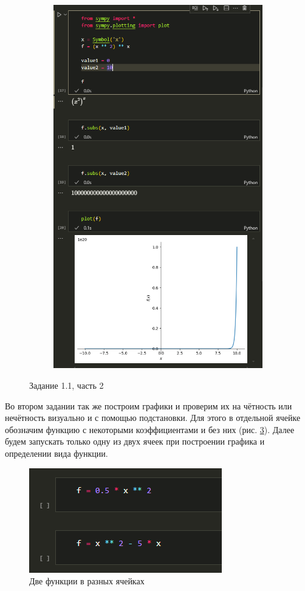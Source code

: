 \documentclass[14pt,a4paper]{extarticle}
\begin{document}
\begin{figure}[!ht]
\begin{subfigure}{.5\textwidth}
        \includegraphics[width=0.9\linewidth]{figures/1.1 (4).png}
        \label{fig:1.1(4)}
    \end{subfigure}
    \caption{Задание 1.1, часть 2}
    \label{fig:1.1-part2}
\end{figure}

Во втором задании так же построим графики и проверим их на чётность
или нечётность визуально и с помощью подстановки. Для этого в отдельной
ячейке обозначим функцию с некоторыми коэффициентами и без них (рис. \ref{fig:1.2-2funcs}).
Далее будем запускать только одну из двух ячеек при построении графика и
определении вида функции.

\begin{figure}[!ht]
    \centering
    \includegraphics[width=0.5\linewidth]{figures/2 functions.png}
    \caption{Две функции в разных ячейках}
    \label{fig:1.2-2funcs}
\end{figure}
\end{document}
